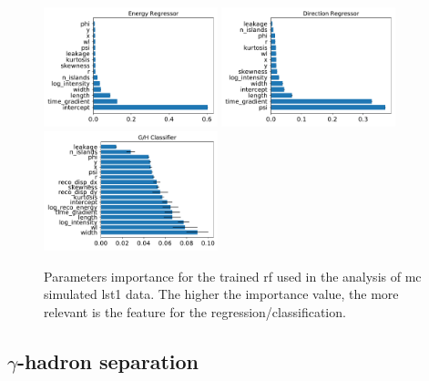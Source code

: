 \documentclass[main.tex]{subfiles}
\begin{document}
\begin{figure}
\centering
\includegraphics[width=0.45\textwidth]{Pictures/reg_energy_importances.pdf}
\includegraphics[width=0.45\textwidth]{Pictures/reg_disp_vector_importances.pdf}
\includegraphics[width=0.45\textwidth]{Pictures/gls_importances.pdf}
  \caption{Parameters importance for the trained \gls{rf} used in the analysis of \gls{mc} simulated \gls{lst}1 data. The higher the importance value, the more relevant is the feature for the regression/classification.}
    \label{fig:importances}
\end{figure}


\subsection{$\gamma$-hadron separation} \label{sec:gammahsep}
\end{document}
